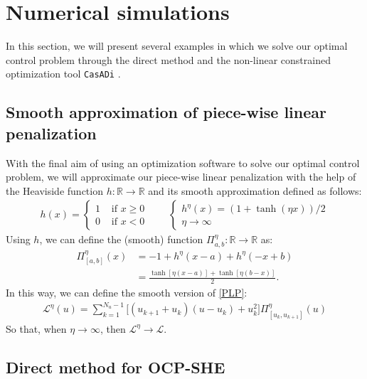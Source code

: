 \section{Numerical simulations}\label{Section5}

In this section, we will present several examples in which we solve our optimal control problem through the direct method and the non-linear constrained optimization tool \texttt{CasADi} \cite{Andersson2019}.
%
\subsection{Smooth approximation of piece-wise linear penalization}

With the final aim of using an optimization software to solve our optimal control problem, we will approximate our piece-wise linear penalization with the help of the Heaviside function $h:\mathbb{R} \rightarrow \mathbb{R}$ and its smooth approximation defined as follows: 
\begin{gather}
    h(x) = \begin{cases}
        1 & \text{ if } x \geq 0 \\
        0 & \text{ if } x < 0
    \end{cases}    
    \hspace{2em} 
    \begin{cases}
        h^\eta(x) = (1 + \tanh(\eta x))/2   \\
        \eta \rightarrow \infty
    \end{cases}
\end{gather}
Using $h$, we can define the (smooth) function $\Pi_{a,b}^\eta:\mathbb{R} \rightarrow \mathbb{R}$ as:
\begin{align*}
    \Pi_{[a,b]}^\eta(x) &= - 1 + h^\eta(x-a) + h^\eta(-x+b) 
    \\
    &= \frac{\tanh[\eta( x -a)] + \tanh[\eta (b-x)]}{2}.
\end{align*}
In this way, we can define the smooth version of \eqref{PLP}:
\begin{gather}
    \mathcal{L}^\eta(u) = \sum_{k = 1}^{N_u-1} \big[ (u_{k+1}+u_{k}) (u-u_k) + u_k^2 \big] \Pi^\eta_{[u_k,u_{k+1}]}(u)
\end{gather}
So that, when $\eta \rightarrow \infty$, then $\mathcal{L}^\eta \rightarrow \mathcal{L}$. 

\subsection{Direct method  for  OCP-SHE}

